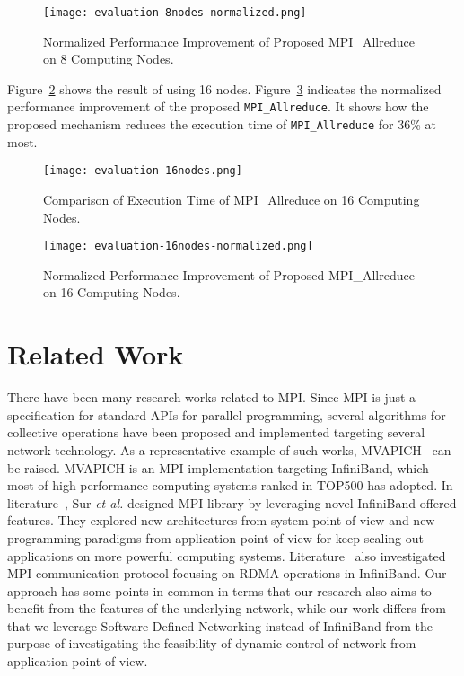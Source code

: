 \begin{figure}[htbp]
    \centering
    \texttt{[image: evaluation-8nodes-normalized.png]}
    \caption{Normalized Performance Improvement of Proposed MPI\_Allreduce on 8 Computing Nodes.}%
    \label{fig-evaluation-8nodes-normalized}
\end{figure}

Figure~\ref{fig-evaluation-16nodes} shows the result of using 16 nodes.
Figure~\ref{fig-evaluation-16nodes-normalized} indicates the normalized
performance improvement of the proposed \texttt{MPI\_Allreduce}. It
shows how the proposed mechanism reduces the execution time of
\texttt{MPI\_Allreduce} for 36\% at most.

\begin{figure}[htbp]
    \centering
    \texttt{[image: evaluation-16nodes.png]}
    \caption{Comparison of Execution Time of MPI\_Allreduce on 16 Computing Nodes.}%
    \label{fig-evaluation-16nodes}
\end{figure}

\begin{figure}[htbp]
    \centering
    \texttt{[image: evaluation-16nodes-normalized.png]}
    \caption{Normalized Performance Improvement of Proposed MPI\_Allreduce on 16 Computing Nodes.}%
    \label{fig-evaluation-16nodes-normalized}
\end{figure}

\hypertarget{related-work}{%
\section{Related Work}\label{related-work}}

There have been many research works related to MPI\@. Since MPI is just a
specification for standard APIs for parallel programming, several
algorithms for collective operations have been proposed and implemented
targeting several network technology. As a representative example of
such works, MVAPICH~\cite{mvapich} can be raised. MVAPICH is an MPI
implementation targeting InfiniBand, which most of high-performance
computing systems ranked in TOP500 has adopted. In
literature~\cite{PjesivacGrbovic2011}, Sur \emph{et al.} designed MPI library
by leveraging novel InfiniBand-offered features. They explored new
architectures from system point of view and new programming paradigms from
application point of view for keep scaling out applications on more powerful
computing systems. Literature~\cite{Jiuxing2004} also investigated MPI
communication protocol focusing on RDMA operations in InfiniBand. Our approach
has some points in common in terms that our research also aims to benefit from
the features of the underlying network, while our work differs from that we
leverage Software Defined Networking instead of InfiniBand from the purpose of
investigating the feasibility of dynamic control of network from application
point of view.

